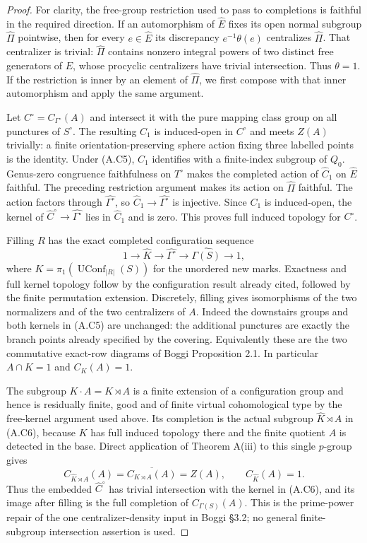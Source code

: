 \begin{proof}
For clarity, the free-group restriction used to pass to completions
is faithful in the required direction.  If an automorphism of
$\widehat E$ fixes its open normal subgroup $\widehat\Pi$
pointwise, then for every $e\in\widehat E$ its discrepancy
$e^{-1}\theta(e)$ centralizes $\widehat\Pi$.  That centralizer is
trivial: $\widehat\Pi$ contains nonzero integral powers of two
distinct free generators of $E$, whose procyclic centralizers have
trivial intersection.  Thus $\theta=1$.  If the restriction is
inner by an element of $\widehat\Pi$, we first compose with that
inner automorphism and apply the same argument.

Let $C^\circ=C_{\Gamma^\circ}(A)$ and intersect it with the pure
mapping class group on all punctures of $S^\circ$.  The resulting
$C_1$ is induced-open in $C^\circ$ and meets $Z(A)$ trivially:
a finite orientation-preserving sphere action fixing three labelled
points is the identity.  Under (A.C5), $C_1$ identifies with a
finite-index subgroup of $Q_0$.  Genus-zero congruence faithfulness
on $T^\circ$ makes the completed action of $\widehat C_1$ on
$\widehat E$ faithful.  The preceding restriction argument makes
its action on $\widehat\Pi$ faithful.  The action factors through
$\widehat{\Gamma^\circ}$, so
$\widehat C_1\to\widehat{\Gamma^\circ}$ is injective.  Since
$C_1$ is induced-open, the kernel of
$\widehat C^\circ\to\widehat{\Gamma^\circ}$ lies in
$\widehat C_1$ and is zero.  This proves full induced topology for
$C^\circ$.

Filling $R$ has the exact completed configuration sequence
\[
 1\longrightarrow\widehat K\longrightarrow
 \widehat{\Gamma^\circ}\longrightarrow\widehat{\Gamma(S)}
 \longrightarrow1,                                      \tag{A.C6}
\]
where $K=\pi_1(\operatorname{UConf}_{|R|}(S))$ for the unordered
new marks.  Exactness and full kernel topology follow by the
configuration result already cited, followed by the finite
permutation extension.  Discretely, filling gives isomorphisms
of the two normalizers and of the two centralizers of $A$.
Indeed the downstairs groups and both kernels in (A.C5) are
unchanged: the additional punctures are exactly the branch points
already specified by the covering.  Equivalently these are the two
commutative exact-row diagrams of Boggi Proposition 2.1.  In
particular $A\cap K=1$ and $C_K(A)=1$.

The subgroup $K\cdot A=K\rtimes A$ is a finite extension of a
configuration group and hence is residually finite, good and of
finite virtual cohomological type by the free-kernel argument used
above.  Its completion is the actual subgroup
$\widehat K\rtimes A$ in (A.C6), because $K$ has full induced
topology there and the finite quotient $A$ is detected in the base.
Direct application of Theorem A(iii) to this single $p$-group gives
\[
 C_{\widehat K\rtimes A}(A)
   =\overline{C_{K\rtimes A}(A)}=Z(A),\qquad
 C_{\widehat K}(A)=1.                                    \tag{A.C7}
\]
Thus the embedded $\widehat C^\circ$ has trivial intersection with
the kernel in (A.C6), and its image after filling is the full
completion of $C_{\Gamma(S)}(A)$.  This is the prime-power repair
of the one centralizer-density input in Boggi \S3.2; no general
finite-subgroup intersection assertion is used.


\end{proof}
